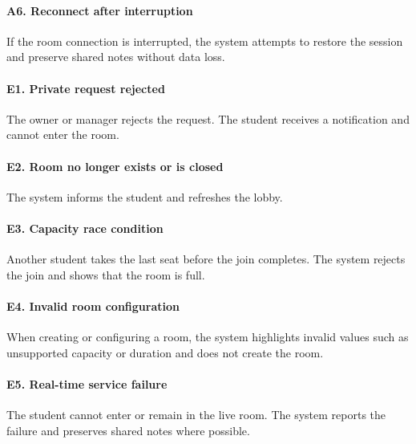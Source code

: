 \documentclass[12pt]{article}
\begin{document}
\paragraph*{A6. Reconnect after interruption}
\par\medskip
If the room connection is interrupted, the system attempts to restore the session and preserve shared notes without data loss.
\par\medskip
\hypertarget{sec:e1-private-request-rejected}{}
\paragraph*{E1. Private request rejected}
\par\medskip
The owner or manager rejects the request. The student receives a notification and cannot enter the room.
\par\medskip
\hypertarget{sec:e2-room-no-longer-exists-or-is-closed}{}
\paragraph*{E2. Room no longer exists or is closed}
\par\medskip
The system informs the student and refreshes the lobby.
\par\medskip
\hypertarget{sec:e3-capacity-race-condition}{}
\paragraph*{E3. Capacity race condition}
\par\medskip
Another student takes the last seat before the join completes. The system rejects the join and shows that the room is full.
\par\medskip
\hypertarget{sec:e4-invalid-room-configuration}{}
\paragraph*{E4. Invalid room configuration}
\par\medskip
When creating or configuring a room, the system highlights invalid values such as unsupported capacity or duration and does not create the room.
\par\medskip
\hypertarget{sec:e5-real-time-service-failure}{}
\paragraph*{E5. Real-time service failure}
\par\medskip
The student cannot enter or remain in the live room. The system reports the failure and preserves shared notes where possible.
\par\medskip
\hypertarget{sec:e6-unauthorized-or-blocked-participant}{}
\end{document}
